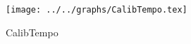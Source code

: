 \begin{figure}[h] \centering\texttt{[image: ../../graphs/CalibTempo.tex]}\caption{CalibTempo}\label{gr:CalibTempo} \end{figure}
